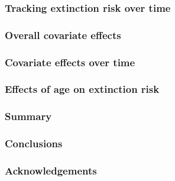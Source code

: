 \documentclass{beamer}
\begin{document}
\begin{frame}
  \frametitle{Tracking extinction risk over time}
  
\end{frame}


\begin{frame}
  \frametitle{Overall covariate effects}  

\end{frame}


\begin{frame}
  \frametitle{Covariate effects over time}  

\end{frame}


\begin{frame}
  \frametitle{Effects of age on extinction risk}

\end{frame}


\begin{frame}
  \frametitle{Summary}

\end{frame}


\begin{frame}
  \frametitle{Conclusions}

\end{frame}


\begin{frame}
  \frametitle{Acknowledgements}

\end{frame}
\end{document}
